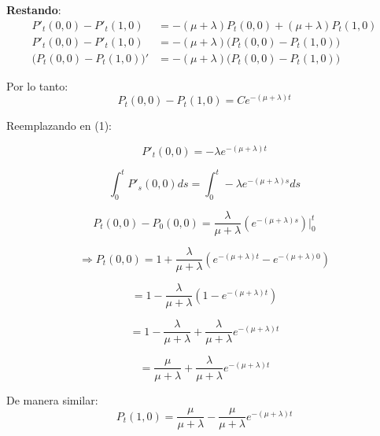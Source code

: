 \documentclass[12pt,a4paper]{article}
\begin{document}
\textbf{Restando}:
\begin{align*}
P'_t(0,0) - P'_t(1,0) &= -(\mu + \lambda) P_t(0,0) + (\mu + \lambda) P_t(1,0) \\
P'_t(0,0) - P'_t(1,0) &= -(\mu + \lambda) \big(P_t(0,0) - P_t(1,0)\big) \\
\big(P_t(0,0) - P_t(1,0)\big)' &= -(\mu + \lambda) \big(P_t(0,0) - P_t(1,0)\big)
\end{align*}

Por lo tanto:
\begin{equation*}
P_t(0,0) - P_t(1,0) = Ce^{-(\mu+\lambda)t}
\end{equation*}

Reemplazando en (1):

\begin{equation*}
P'_t(0,0) = -\lambda e^{-(\mu+\lambda)t}
\end{equation*}

\begin{equation*}
\int_0^t P'_s(0,0) ds = \int_0^t -\lambda e^{-(\mu+\lambda)s} ds
\end{equation*}

\begin{equation*}
P_t(0,0) - P_0(0,0) = \frac{\lambda}{\mu+\lambda} \left(e^{-(\mu+\lambda)s}\right)\Bigg|_0^t
\end{equation*}

\begin{equation*}
\Rightarrow P_t(0,0) = 1 + \frac{\lambda}{\mu+\lambda} \left(e^{-(\mu+\lambda)t} - e^{-(\mu+\lambda)0}\right)
\end{equation*}

\begin{equation*}
= 1 - \frac{\lambda}{\mu+\lambda} \left(1 - e^{-(\mu+\lambda)t}\right)
\end{equation*}

\begin{equation*}
= 1 - \frac{\lambda}{\mu+\lambda} + \frac{\lambda}{\mu+\lambda} e^{-(\mu+\lambda)t}
\end{equation*}

\begin{equation*}
= \frac{\mu}{\mu+\lambda} + \frac{\lambda}{\mu+\lambda} e^{-(\mu+\lambda)t}
\end{equation*}

De manera similar:
\begin{equation*}
P_t(1,0) = \frac{\mu}{\mu+\lambda} - \frac{\mu}{\mu+\lambda} e^{-(\mu+\lambda)t}
\end{equation*}
\end{document}
